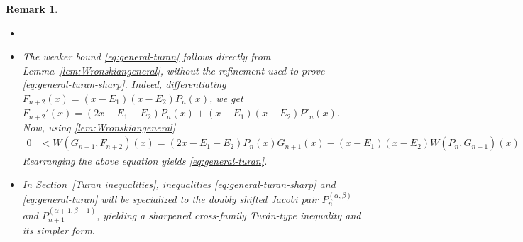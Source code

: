 \documentclass[final,3p,times,12pt]{elsarticle}
\newtheorem{remark}{Remark}[section]
\numberwithin{equation}{section}  %
\begin{document}
\begin{remark} \begin{itemize} \item[]
\item[(i)]The weaker bound \eqref{eq:general-turan} follows directly from Lemma~\ref{lem:Wronskiangeneral}, without the refinement used to prove \eqref{eq:general-turan-sharp}. Indeed, differentiating $F_{n+2}(x)=(x-E_1)(x-E_2)P_n(x)$, we get
	$F_{n+2}'(x)=(2x-E_1-E_2)P_n(x)+(x-E_1)(x-E_2)P'_n(x)$. Now,  using \eqref{lem:Wronskiangeneral}
	\begin{align}
		\nonumber			0&<W(G_{n+1},F_{n+2})(x)=(2x-E_1-E_2)P_n(x)G_{n+1}(x) -(x-E_1)(x-E_2)W(P_n,G_{n+1})(x)
	\end{align}
	Rearranging the above equation yields \eqref{eq:general-turan}.	
\item[(ii)] In Section~\ref{Turan inequalities}, inequalities \eqref{eq:general-turan-sharp} and \eqref{eq:general-turan}
will be specialized to the doubly shifted Jacobi pair
\(P_n^{(\alpha,\beta)}\) and
\(P_{n+1}^{(\alpha+1,\beta+1)}\), yielding a sharpened cross-family Turán-type inequality and its simpler form.  
\end{itemize}
\end{remark}
\end{document}
